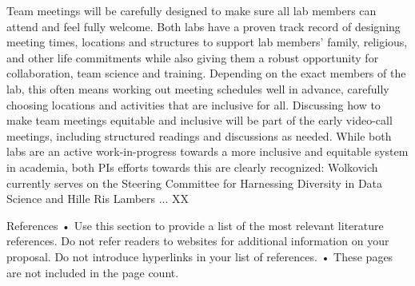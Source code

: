 \documentclass[11pt]{article}
\begin{document}
Team meetings will be carefully designed to make sure all lab members can attend and feel fully welcome. Both labs have a proven track record of designing meeting times, locations and structures to support lab members' family, religious, and other life commitments while also giving them a robust opportunity for collaboration, team science and training. Depending on the exact members of the lab, this often means working out meeting schedules well in advance, carefully choosing locations and activities that are inclusive for all. Discussing how to make team meetings equitable and inclusive  will be part of the early video-call meetings, including structured readings and discussions as needed. While both labs are an active work-in-progress towards a more inclusive and equitable system in academia, both PIs efforts towards this are clearly recognized: Wolkovich currently serves on the Steering Committee for Harnessing Diversity in Data Science and Hille Ris Lambers ... XX %

References %
•	Use this section to provide a list of the most relevant literature references. Do not refer readers to websites for additional information on your proposal. Do not introduce hyperlinks in your list of references.
•	These pages are not included in the page count.

\end{document}
